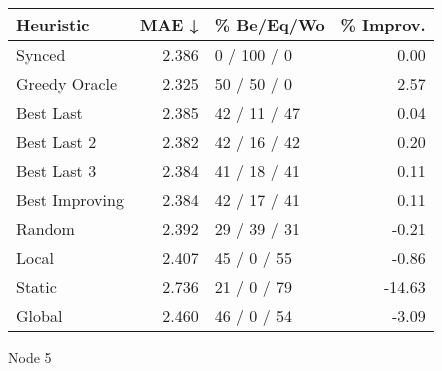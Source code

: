 \begin{tabular}{lrlr}
\toprule
\textbf{Heuristic} & \textbf{MAE ↓} & \textbf{\% Be/Eq/Wo} & \textbf{\% Improv.} \\
\midrule
            Synced &          2.386 &          0 / 100 / 0 &                0.00 \\
     Greedy Oracle &          2.325 &          50 / 50 / 0 &                2.57 \\
         Best Last &          2.385 &         42 / 11 / 47 &                0.04 \\
       Best Last 2 &          2.382 &         42 / 16 / 42 &                0.20 \\
       Best Last 3 &          2.384 &         41 / 18 / 41 &                0.11 \\
    Best Improving &          2.384 &         42 / 17 / 41 &                0.11 \\
            Random &          2.392 &         29 / 39 / 31 &               -0.21 \\
             Local &          2.407 &          45 / 0 / 55 &               -0.86 \\
            Static &          2.736 &          21 / 0 / 79 &              -14.63 \\
            Global &          2.460 &          46 / 0 / 54 &               -3.09 \\
\bottomrule
\end{tabular}
\caption{Node 5}
\label{tab:ds_iid_lr05_le1_bs2_5}
